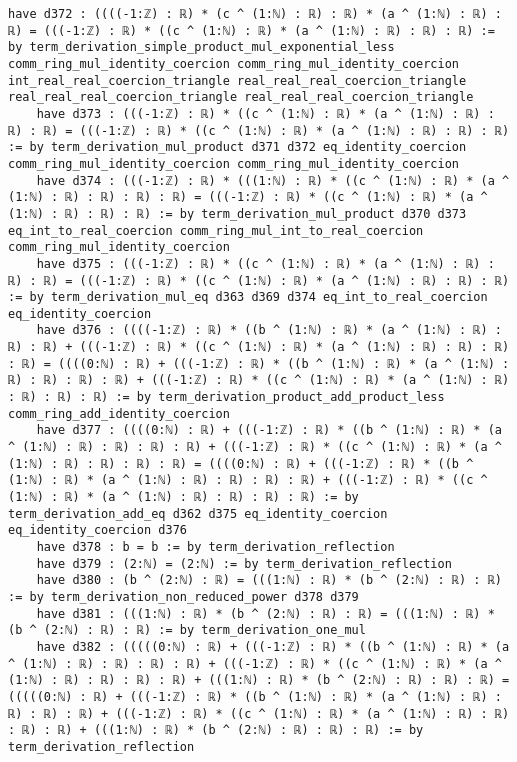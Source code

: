 \documentclass{article}
\begin{document}
\begin{tcolorbox}[colback=white!10, width=\linewidth]
\begin{lstlisting}[language=Lean4]
    have d372 : ((((-1:ℤ) : ℝ) * (c ^ (1:ℕ) : ℝ) : ℝ) * (a ^ (1:ℕ) : ℝ) : ℝ) = (((-1:ℤ) : ℝ) * ((c ^ (1:ℕ) : ℝ) * (a ^ (1:ℕ) : ℝ) : ℝ) : ℝ) := by term_derivation_simple_product_mul_exponential_less comm_ring_mul_identity_coercion comm_ring_mul_identity_coercion int_real_real_coercion_triangle real_real_real_coercion_triangle real_real_real_coercion_triangle real_real_real_coercion_triangle
    have d373 : (((-1:ℤ) : ℝ) * ((c ^ (1:ℕ) : ℝ) * (a ^ (1:ℕ) : ℝ) : ℝ) : ℝ) = (((-1:ℤ) : ℝ) * ((c ^ (1:ℕ) : ℝ) * (a ^ (1:ℕ) : ℝ) : ℝ) : ℝ) := by term_derivation_mul_product d371 d372 eq_identity_coercion comm_ring_mul_identity_coercion comm_ring_mul_identity_coercion
    have d374 : (((-1:ℤ) : ℝ) * (((1:ℕ) : ℝ) * ((c ^ (1:ℕ) : ℝ) * (a ^ (1:ℕ) : ℝ) : ℝ) : ℝ) : ℝ) = (((-1:ℤ) : ℝ) * ((c ^ (1:ℕ) : ℝ) * (a ^ (1:ℕ) : ℝ) : ℝ) : ℝ) := by term_derivation_mul_product d370 d373 eq_int_to_real_coercion comm_ring_mul_int_to_real_coercion comm_ring_mul_identity_coercion
    have d375 : (((-1:ℤ) : ℝ) * ((c ^ (1:ℕ) : ℝ) * (a ^ (1:ℕ) : ℝ) : ℝ) : ℝ) = (((-1:ℤ) : ℝ) * ((c ^ (1:ℕ) : ℝ) * (a ^ (1:ℕ) : ℝ) : ℝ) : ℝ) := by term_derivation_mul_eq d363 d369 d374 eq_int_to_real_coercion eq_identity_coercion
    have d376 : ((((-1:ℤ) : ℝ) * ((b ^ (1:ℕ) : ℝ) * (a ^ (1:ℕ) : ℝ) : ℝ) : ℝ) + (((-1:ℤ) : ℝ) * ((c ^ (1:ℕ) : ℝ) * (a ^ (1:ℕ) : ℝ) : ℝ) : ℝ) : ℝ) = ((((0:ℕ) : ℝ) + (((-1:ℤ) : ℝ) * ((b ^ (1:ℕ) : ℝ) * (a ^ (1:ℕ) : ℝ) : ℝ) : ℝ) : ℝ) + (((-1:ℤ) : ℝ) * ((c ^ (1:ℕ) : ℝ) * (a ^ (1:ℕ) : ℝ) : ℝ) : ℝ) : ℝ) := by term_derivation_product_add_product_less comm_ring_add_identity_coercion
    have d377 : ((((0:ℕ) : ℝ) + (((-1:ℤ) : ℝ) * ((b ^ (1:ℕ) : ℝ) * (a ^ (1:ℕ) : ℝ) : ℝ) : ℝ) : ℝ) + (((-1:ℤ) : ℝ) * ((c ^ (1:ℕ) : ℝ) * (a ^ (1:ℕ) : ℝ) : ℝ) : ℝ) : ℝ) = ((((0:ℕ) : ℝ) + (((-1:ℤ) : ℝ) * ((b ^ (1:ℕ) : ℝ) * (a ^ (1:ℕ) : ℝ) : ℝ) : ℝ) : ℝ) + (((-1:ℤ) : ℝ) * ((c ^ (1:ℕ) : ℝ) * (a ^ (1:ℕ) : ℝ) : ℝ) : ℝ) : ℝ) := by term_derivation_add_eq d362 d375 eq_identity_coercion eq_identity_coercion d376
    have d378 : b = b := by term_derivation_reflection
    have d379 : (2:ℕ) = (2:ℕ) := by term_derivation_reflection
    have d380 : (b ^ (2:ℕ) : ℝ) = (((1:ℕ) : ℝ) * (b ^ (2:ℕ) : ℝ) : ℝ) := by term_derivation_non_reduced_power d378 d379
    have d381 : (((1:ℕ) : ℝ) * (b ^ (2:ℕ) : ℝ) : ℝ) = (((1:ℕ) : ℝ) * (b ^ (2:ℕ) : ℝ) : ℝ) := by term_derivation_one_mul
    have d382 : (((((0:ℕ) : ℝ) + (((-1:ℤ) : ℝ) * ((b ^ (1:ℕ) : ℝ) * (a ^ (1:ℕ) : ℝ) : ℝ) : ℝ) : ℝ) + (((-1:ℤ) : ℝ) * ((c ^ (1:ℕ) : ℝ) * (a ^ (1:ℕ) : ℝ) : ℝ) : ℝ) : ℝ) + (((1:ℕ) : ℝ) * (b ^ (2:ℕ) : ℝ) : ℝ) : ℝ) = (((((0:ℕ) : ℝ) + (((-1:ℤ) : ℝ) * ((b ^ (1:ℕ) : ℝ) * (a ^ (1:ℕ) : ℝ) : ℝ) : ℝ) : ℝ) + (((-1:ℤ) : ℝ) * ((c ^ (1:ℕ) : ℝ) * (a ^ (1:ℕ) : ℝ) : ℝ) : ℝ) : ℝ) + (((1:ℕ) : ℝ) * (b ^ (2:ℕ) : ℝ) : ℝ) : ℝ) := by term_derivation_reflection

\end{lstlisting}
\end{tcolorbox}
\end{document}
